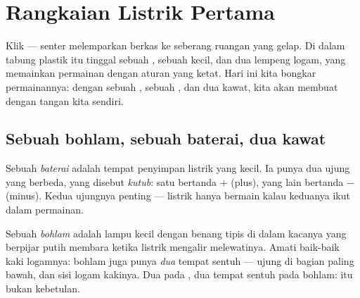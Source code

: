 \chapter{Rangkaian Listrik Pertama}\label{ch:g3:first-electric-circuit}

Klik --- senter melemparkan berkas  ke seberang ruangan yang
gelap.
Di dalam tabung plastik itu tinggal sebuah , sebuah 
kecil, dan dua lempeng logam, yang memainkan permainan dengan aturan
yang ketat. Hari ini kita bongkar permainannya: dengan sebuah ,
sebuah , dan dua kawat, kita akan membuat  dengan tangan
kita sendiri.

\section{Sebuah bohlam, sebuah baterai, dua kawat}

\begin{definition}[Baterai]\label{def:g3:first-electric-circuit:battery}
Sebuah \emph{baterai} adalah tempat penyimpan listrik
yang kecil. Ia punya dua ujung yang berbeda, yang disebut
\emph{kutub}: satu bertanda $+$ (plus), yang lain
bertanda $-$ (minus). Kedua ujungnya penting --- listrik hanya bermain
kalau keduanya ikut dalam permainan.
\end{definition}

\begin{definition}[Bohlam]\label{def:g3:first-electric-circuit:bulb}
Sebuah \emph{bohlam} adalah lampu kecil dengan benang
tipis di dalam kacanya yang berpijar putih membara ketika listrik
mengalir melewatinya. Amati baik-baik kaki logamnya: bohlam juga punya
\emph{dua} tempat sentuh --- ujung di bagian paling bawah, dan sisi
logam kakinya. Dua  pada , dua tempat sentuh pada bohlam:
itu bukan kebetulan.
\end{definition}

